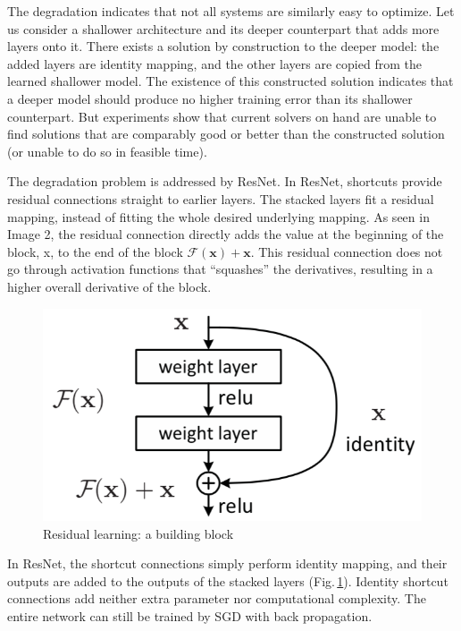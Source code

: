 The degradation indicates that not all systems are similarly easy to optimize. Let us consider a shallower architecture and its deeper counterpart that adds more layers onto it. There exists a solution by construction to the deeper model: the added layers are identity mapping, and the other layers are copied from the learned shallower model. The existence of this constructed solution indicates that a deeper model should produce no higher training error than its shallower counterpart. But experiments show that current solvers on hand are unable to find solutions that are comparably good or better than the constructed solution (or unable to do so in feasible time). 

The degradation problem is addressed by ResNet. In ResNet, shortcuts provide residual connections straight to earlier layers. The stacked layers fit a residual mapping, instead of fitting the whole desired underlying mapping. As seen in Image 2, the residual connection directly adds the value at the beginning of the block, x, to the end of the block $\mathcal{F}(\mathbf{x})+\mathbf{x}$. This residual connection does not go through activation functions that “squashes” the derivatives, resulting in a higher overall derivative of the block.

\begin{figure}[h]
	\centering
	\includegraphics[scale=0.5]{Figs/residualblock.png}
    \caption{Residual learning: a building block \cite{resnet}}
    \label{residualblock}
\end{figure}

In ResNet, the shortcut connections simply perform identity mapping, and their outputs are added to the outputs of the stacked layers (Fig.\,\ref{residualblock}). Identity shortcut connections add neither extra parameter nor computational complexity. The entire network can still be trained by SGD with back propagation.

